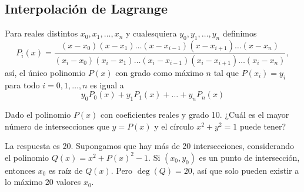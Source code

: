 \subsection{Interpolación de Lagrange}

\begin{theorem}
    Para reales distintos $x_0, x_1, \ldots, x_n$ y cualesquiera $y_0, y_1, \ldots, y_n$ definimos
    \[
        P_i(x) = \frac{(x - x_0)(x - x_1)\ldots(x - x_{i - 1})(x - x_{i + 1})\ldots(x - x_n)}{(x_i - x_0)(x_i - x_1)\ldots(x_i - x_{i - 1})(x_i - x_{i + 1})\ldots(x_i - x_n)},
    \]
    así, el único polinomio $P(x)$ con grado como máximo $n$ tal que $P(x_i) = y_i$ para todo $i = 0, 1, \ldots, n$ es igual a
    \[
        y_0 P_0(x) + y_1 P_1(x) + \ldots + y_n P_n(x)
    \]
\end{theorem}

\begin{example}
    Dado el polinomio $P(x)$ con coeficientes reales y grado 10.
    ¿Cuál es el mayor número de intersecciones que $y = P(x)$ y el círculo $x^2 + y^2 = 1$ puede tener?
\end{example}

\begin{solution}
    La respuesta es 20.
    Supongamos que hay más de 20 intersecciones, considerando el polinomio $Q(x) =  x^2 + P(x)^2 - 1$.
    Si $(x_0, y_0)$ es un punto de intersección, entonces $x_0$ es raíz de $Q(x)$.
    Pero $\deg{(Q)} = 20$, así que solo pueden existir a lo máximo 20 valores $x_0$.
\end{solution}